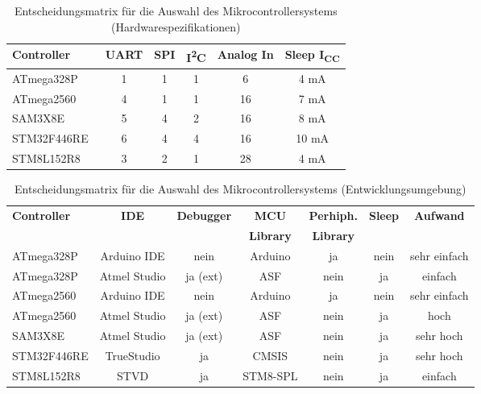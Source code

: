     \begin{table}[H]
        \centering
        \begin{tabular}{|l|c|c|c|c|c|}
            \hline
            \textbf{Controller} & \textbf{UART} & \textbf{SPI} & \textbf{I\textsuperscript{2}C} & \textbf{Analog In} & \textbf{Sleep I\textsubscript{CC}}\\
            \hline
            ATmega328P~\cite{ds_atmega328p} & 1 & 1 & 1 & 6  & 4 mA  \\
            ATmega2560~\cite{ds_atmega2560} & 4 & 1 & 1 & 16 & 7 mA  \\
            SAM3X8E~\cite{ds_sam3x8e}       & 5 & 4 & 2 & 16 & 8 mA  \\
            STM32F446RE~\cite{ds_stm32f446} & 6 & 4 & 4 & 16 & 10 mA \\
            STM8L152R8~\cite{ds_stm8l152r8} & 3 & 2 & 1 & 28 & 4 mA  \\
            \hline
        \end{tabular}
        \caption{Entscheidungsmatrix für die Auswahl des Mikrocontrollersystems (Hardwarespezifikationen)}
        \label{tab:mcu_auswahl_hardware}
    \end{table}
    \begin{table}[H]
        \centering
        \begin{tabular}{|l|c|c|c|c|c|c|}
            \hline
            \textbf{Controller} & \textbf{IDE} & \textbf{Debugger}  & \textbf{MCU} & \textbf{Perhiph.} & \textbf{Sleep} & \textbf{Aufwand} \\
            \textbf{} & \textbf{} & \textbf{} & \textbf{Library} & \textbf{Library} & \textbf{} & \textbf{} \\
            \hline
            ATmega328P          & Arduino IDE  & nein & Arduino & ja & nein & sehr einfach \\
            ATmega328P          & Atmel Studio & ja (ext) & ASF & nein & ja & einfach \\
            ATmega2560          & Arduino IDE  & nein & Arduino & ja & nein & sehr einfach \\
            ATmega2560          & Atmel Studio & ja (ext) & ASF & nein & ja & hoch \\
            SAM3X8E             & Atmel Studio & ja (ext) & ASF & nein & ja & sehr hoch \\
            STM32F446RE         & TrueStudio & ja & CMSIS & nein & ja & sehr hoch \\
            STM8L152R8          & STVD & ja & STM8-SPL & nein & ja & einfach \\
            \hline
        \end{tabular}
        \caption{Entscheidungsmatrix für die Auswahl des Mikrocontrollersystems (Entwicklungsumgebung)}
        \label{tab:mcu_auswahl_ide}
    \end{table}


